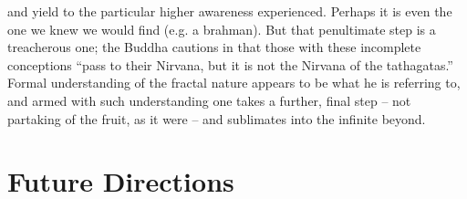 \documentclass[pra,twocolumn,groupedaddress,10pt]{revtex4}
\theoremstyle{definition}
\begin{document}
and yield to the particular higher awareness experienced. Perhaps it is even the one we knew we would find (e.g. a brahman). But that penultimate step is a treacherous one; the Buddha cautions in \cite{lankavatara} that those with these incomplete conceptions ``pass to their Nirvana, but it is not the Nirvana of the tathagatas.'' Formal understanding of the fractal nature appears to be what he is referring to, and armed with such understanding one takes a further, final step -- not partaking of the fruit, as it were -- and sublimates into the infinite beyond.


\section{Future Directions} \label{sec:futdir}
\end{document}
